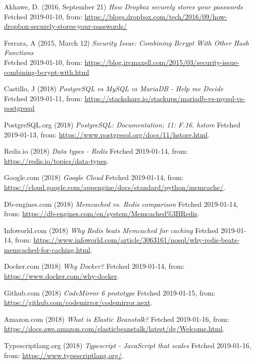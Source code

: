 \documentclass[12pt,a4paper]{report}
\begin{document}
{\begin{thebibliography}{1}
Akhawe, D. (2016, September 21) {\em How Dropbox securely stores your passwords} \\
Fetched 2019-01-10, from:
\url{https://blogs.dropbox.com/tech/2016/09/how-dropbox-securely-stores-your-passwords/}

Ferrara, A (2015, March 12) {\em Security Issue: Combining Bcrypt With Other Hash Functions} \\
Fetched 2019-01-10, from:
\url{https://blog.ircmaxell.com/2015/03/security-issue-combining-bcrypt-with.html}

Castillo, J (2018) {\em PostgreSQL vs MySQL vs MariaDB - Help me Decide} \\
Fetched 2019-01-11, from:
\url{https://stackshare.io/stackups/mariadb-vs-mysql-vs-postgresql}

PostgreSQL.org (2018) {\em PostgreSQL: Documentation: 11: F.16. hstore} Fetched 2019-01-13, from: \url{https://www.postgresql.org/docs/11/hstore.html}.

Redis.io (2018) {\em Data types - Redis} Fetched 2019-01-14, from: \url{https://redis.io/topics/data-types}.

Google.com (2018) {\em Google Cloud} Fetched 2019-01-14, from: \url{https://cloud.google.com/appengine/docs/standard/python/memcache/}.

Db-engines.com (2018) {\em Memcached vs. Redis comparison} Fetched 2019-01-14, from: \url{https://db-engines.com/en/system/Memcached%3BRedis}.

Infoworld.com (2018) {\em Why Redis beats Memcached for caching} Fetched 2019-01-14, from: \url{https://www.infoworld.com/article/3063161/nosql/why-redis-beats-memcached-for-caching.html}.

Docker.com (2018) {\em Why Docker?} Fetched 2019-01-14, from: \url{https://www.docker.com/why-docker}.

Github.com (2018) {\em CodeMirror 6 prototype} Fetched 2019-01-15, from: \url{https://github.com/codemirror/codemirror.next}.

Amazon.com (2018) {\em What is Elastic Beanstalk?} Fetched 2019-01-16, from: \url{https://docs.aws.amazon.com/elasticbeanstalk/latest/dg/Welcome.html}.

Typescriptlang.org (2018) {\em Typescript - JavaScript that scales} Fetched 2019-01-16, from: \url{https://www.typescriptlang.org/}.


\end{thebibliography}}
\end{document}
